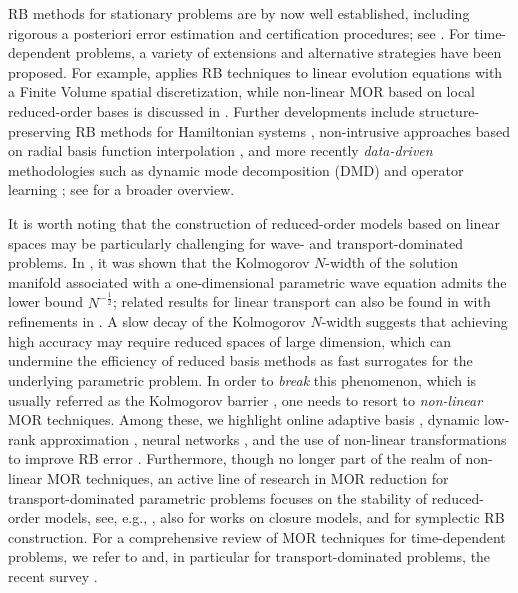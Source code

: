 RB methods for stationary problems are by now well established, including rigorous
a posteriori error estimation and certification procedures; see
\cite{hesthaven2016certified,quarteroni2015reduced,prud2002reliable,rozza2014fundamentals}.
For time-dependent problems, a variety of extensions and alternative strategies have been proposed.
For example, \cite{haasdonk2008reduced} applies RB techniques to linear evolution equations
with a Finite Volume spatial discretization, while non-linear MOR based on local
reduced-order bases is discussed in \cite{lieu2006reduced}.
Further developments include structure-preserving RB methods for Hamiltonian systems
\cite{afkham2017structure,hesthaven2022rank,hesthaven2021structure,hesthaven2023adaptive},
non-intrusive approaches based on radial basis function interpolation
\cite{audouze2013nonintrusive,xiao2017parameterized}, and more recently {\it data-driven}
methodologies such as dynamic mode decomposition (DMD)
\cite{schmid2010dynamic,kutz2016dynamic,duan2023non} and operator learning
\cite{peherstorfer2016data,duan2023machine}; see \cite{Hesthaven2022} for a broader overview.

It is worth noting that the construction of reduced-order models based on linear spaces
may be particularly challenging for wave- and transport-dominated problems.
In \cite{GU19}, it was shown that the Kolmogorov $N$-width of the solution manifold
associated with a one-dimensional parametric wave equation admits the lower bound
$N^{-\frac{1}{2}}$; related results for linear transport can also be found in \cite{OhlbergerRave2016} with refinements in \cite{AGU25}.
A slow decay of the Kolmogorov $N$-width suggests that achieving high accuracy may require reduced spaces of large dimension, which can undermine the efficiency of reduced basis methods as fast surrogates for the underlying parametric problem.
In order to {\it break} this phenomenon, which is usually referred as the 
Kolmogorov barrier \cite{peherstorfer2022breaking}, one needs to resort to {\it non-linear}
MOR techniques. Among these, we highlight online adaptive basis \cite{peherstorfer2020model,iollo2014advection},
dynamic low-rank approximation \cite{koch2007dynamical,sapsis2009dynamically,musharbash2015error},
neural networks \cite{lee2020model}, and the use of non-linear transformations to improve RB error
\cite{reiss2018shifted,taddei2020registration}.
Furthermore, though no longer part of the realm of non-linear MOR techniques, an active line
of research in MOR reduction for transport-dominated parametric problems focuses on the stability
of reduced-order models, see, e.g., \cite{urban2012new,yano2014space}, also \cite{wang2012proper,pan2018data,iollo2000stability} for works on closure models, and \cite{peng2016symplectic,hesthaven2022structure} for symplectic RB construction.
For a comprehensive review of MOR techniques for time-dependent problems, we refer to \cite{hesthaven2022reduced} and, in particular for transport-dominated problems, the recent survey \cite{hesthaven2026nonlinear}. 



